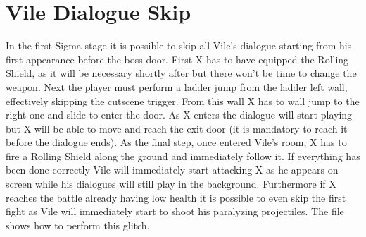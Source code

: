 \section{Vile Dialogue Skip}
In the first Sigma stage it is possible to skip all Vile's dialogue starting from his first appearance before the boss door. First X has to have equipped the Rolling Shield, as it will be necessary shortly after but there won't be time to change the weapon. Next the player must perform a ladder jump from the ladder left wall, effectively skipping the cutscene trigger. From this wall X has to wall jump to the right one and slide to enter the door. As X enters the dialogue will start playing but X will be able to move and reach the exit door (it is mandatory to reach it before the dialogue ends). As the final step, once entered Vile's room, X has to fire a Rolling Shield along the ground and immediately follow it. If everything has been done correctly Vile will immediately start attacking X as he appears on screen while his dialogues will still play in the background. Furthermore if X reaches the battle already having low health it is possible to even skip the first fight as Vile will immediately start to shoot his paralyzing projectiles. The file  shows how to perform this glitch.


